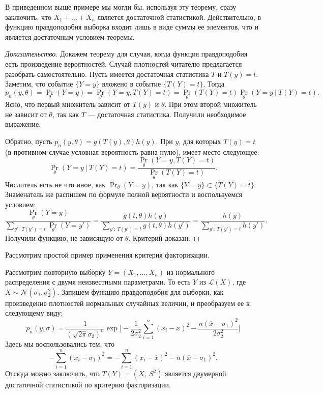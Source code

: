 В приведенном выше примере мы могли бы, используя эту теорему, сразу заключить, что $X_1 + \ldots + X_n$ является достаточной статистикой. Действительно, в функцию правдоподобия выборка входит лишь в виде суммы ее элементов, что и является достаточным условием теоремы.

\begin{proof}[Доказательство]
    Докажем теорему для случая, когда функция правдоподобия есть произведение вероятностей. Случай плотностей читателю предлагается разобрать самостоятельно. Пусть имеется достаточная статистика $T$ и $T(y) = t$. Заметим, что событие $\{Y = y\}$ вложено в событие $\{T(Y) = t\}$. Тогда
    \[
        p_n(y, \theta) = \Pr_\theta(Y = y) = \Pr_\theta(Y = y, T(Y) = t) = \Pr_\theta(T(Y) = t) \Pr_\theta(Y = y \ | \ T(Y) = t).
    \]
    Ясно, что первый множитель зависит от $T(y)$ и $\theta$. При этом второй множитель не зависит от $\theta$, так как $T$ --- достаточная статистика. Получили необходимое выражение.

    Обратно, пусть $p_n(y, \theta) = g(T(y), \theta)h(y)$. При $y$, для которых $T(y) = t$ (в противном случае условная вероятность равна нулю), имеет место следующее:
    \[
        \Pr_\theta(Y = y \ | \ T(Y) = t) = \frac{\Pr_\theta(Y = y, T(Y) = t)}{\Pr_\theta(T(Y) = t)}.
    \]
    Числитель есть не что иное, как $\Pr_\theta(Y = y)$, так как $\{Y = y\} \subset \{T(Y) = t\}$. Знаменатель же распишем по формуле полной вероятности и воспользуемся условием:
    \[
        \frac{\Pr_\theta(Y = y)}{\sum\limits_{y': \ T(y') = t}\Pr_\theta(Y=y')} = \frac{g(t, \theta)h(y)}{\sum\limits_{y': \ T(y') = t}g(t, \theta)h(y')} = \frac{h(y)}{\sum\limits_{y': \ T(y') = t}h(y')}.
    \]
    Получили функцию, не зависящую от $\theta$. Критерий доказан.
\end{proof}

Рассмотрим простой пример применения критерия факторизации.

\begin{example}
    Рассмотрим повторную выборку $Y = (X_1, \ldots, X_n)$ из нормального распределения с двумя неизвестными параметрами. То есть $Y$ из $\mathcal{L}(X)$, где $X \sim \mathcal{N}(\sigma_1, \sigma_2^2)$. Запишем функцию правдоподобия для выборки, как произведение плотностей нормальных случайных величин, и преобразуем ее к следующему виду:
    \[
        p_n(y, \sigma) = \frac{1}{(\sqrt{2 \pi}\sigma_2)^n} \exp\Big[-\frac{1}{2\sigma_2^2} \sum\limits_{i=1}^n(x_i - \overline{x})^2 - \frac{n(\overline{x} - \sigma_1)^2}{2\sigma_2^2} \Big]
    \]
    Здесь мы воспользовались тем, что
    \[
        -\sum\limits_{i=1}^n(x_i - \sigma_1)^2 = -\sum\limits_{i=1}^n(x_i - \overline{x})^2 - n(\overline{x} - \sigma_1)^2.
    \]
    Отсюда можно заключить, что $T(Y) = (\overline{X}, \ S^2)$ является двумерной достаточной статистикой по критерию факторизации.
\end{example}

